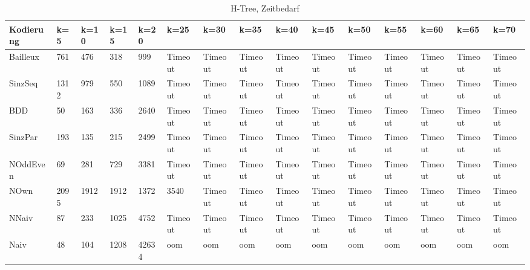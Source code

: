 \documentclass[a4,abstract=on]{scrartcl}
\begin{document}
\begin{landscape}
 \begin{table}[h!]
    \small
    \setlength{\tabcolsep}{0.11cm}
     \centering
     \begin{tabular}[width=\textwidth]{|l|l|l|l|l|l|l|l|l|l|l|l|l|l|l|}
	\hline
       \textbf{Kodierung}  & \textbf{k=5} & \textbf{k=10} & \textbf{k=15} &\textbf{k=20} &\textbf{k=25} &\textbf{k=30} &\textbf{k=35} &\textbf{k=40} &\textbf{k=45} &\textbf{k=50} &\textbf{k=55} &\textbf{k=60} &\textbf{k=65} &\textbf{k=70}\\
	\hline
	Bailleux & 761 & 476 & 318 & 999 & Timeout & Timeout & Timeout & Timeout & Timeout & Timeout & Timeout & Timeout & Timeout & Timeout\\
\hline
	SinzSeq & 1312 & 979 & 550 & 1089 & Timeout & Timeout & Timeout & Timeout & Timeout & Timeout & Timeout & Timeout & Timeout & Timeout \\
\hline
	BDD & 50 & 163 & 336 & 2640 & Timeout & Timeout & Timeout &Timeout &Timeout &Timeout & Timeout & Timeout & Timeout & Timeout\\
\hline
	SinzPar & 193 & 135 & 215 & 2499 & Timeout & Timeout & Timeout & Timeout & Timeout & Timeout & Timeout & Timeout & Timeout & Timeout \\
\hline
	NOddEven & 69 & 281 & 729 & 3381 & Timeout & Timeout & Timeout & Timeout & Timeout & Timeout& Timeout & Timeout & Timeout & Timeout\\
\hline
	NOwn & 2095 & 1912 & 1912 & 1372 & 3540 & Timeout& Timeout & Timeout & Timeout & Timeout & Timeout & Timeout & Timeout & Timeout\\
 \hline
	NNaiv & 87 & 233 & 1025 & 4752 & Timeout & Timeout & Timeout & Timeout & Timeout & Timeout & Timeout & Timeout & Timeout & Timeout\\
\hline
	Naiv & 48 & 104 &  1208 &  42634 &  oom &  oom &  oom &  oom &  oom &  oom &  oom &  oom &  oom &  oom\\
\hline
       
     \end{tabular}

     \caption{H-Tree, Zeitbedarf}
     \label{tbl:beispieltabelle}

   \end{table}


\end{landscape}
\end{document}
